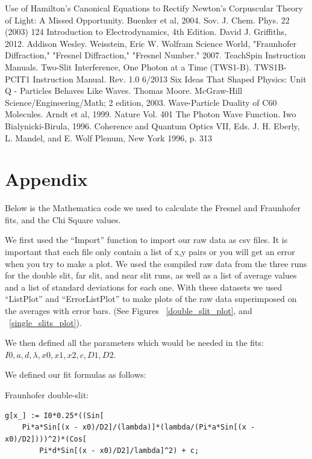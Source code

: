 \documentclass[prb,preprint]{revtex4-1}
\begin{document}
\begin{thebibliography}{3}
 Use of Hamilton's Canonical Equations to Rectify Newton's Corpuscular Theory of Light:  A Missed Opportunity.  Buenker et al, 2004.  Sov. J. Chem. Phys. 22 (2003) 124
 Introduction to Electrodynamics, 4th Edition.  David J. Griffiths, 2012.  Addison Wesley.
Weisstein, Eric W. Wolfram Science World, "Fraunhofer Diffraction," "Fresnel Diffraction," "Fresnel Number." 2007. 
 TeachSpin Instruction Manuals.  Two-Slit Interference, One Photon at a Time (TWS1-B).  TWS1B-PCIT1 Instruction Manual. Rev. 1.0 6/2013
 Six Ideas That Shaped Physics: Unit Q - Particles Behaves Like Waves.  Thomas Moore.  McGraw-Hill Science/Engineering/Math; 2 edition, 2003.
 Wave-Particle Duality of C60 Molecules.  Arndt et al, 1999.  Nature Vol. 401
The Photon Wave Function.  Iwo Bialynicki-Birula, 1996.  Coherence and Quantum Optics VII, Eds. J. H. Eberly, L. Mandel, and E. Wolf
Plenum, New York 1996, p. 313
\end{thebibliography}

\section{Appendix}
Below is the Mathematica code we used to calculate the Fresnel and Fraunhofer fits, and the Chi Square values.  

We first used the ``Import'' function to import our raw data as csv files. It is important that each file only contain a list of x,y pairs or you will get an error when you try to make a plot. We used the compiled raw data from the three runs for the double slit, far slit, and near slit runs, as well as a list of average values and a list of standard deviations for each one. With these datasets we used ``ListPlot'' and ``ErrorListPlot'' to make plots of the raw data superimposed on the averages with error bars.  (See Figures ~\ref{double_slit_plot}, and ~\ref{single_slits_plot}).

We then defined all the parameters which would be needed in the fits: $I0, a, d, \lambda, x0,x1, x2,  c, D1, D2$.

We defined our fit formulas as follows:

Fraunhofer double-slit:
\begin{verbatim}
g[x_] := I0*0.25*((Sin[
	Pi*a*Sin[(x - x0)/D2]/(lambda)]*(lambda/(Pi*a*Sin[(x - x0)/D2])))^2)*(Cos[
		Pi*d*Sin[(x - x0)/D2]/lambda]^2) + c;
\end{verbatim}
\end{document}
